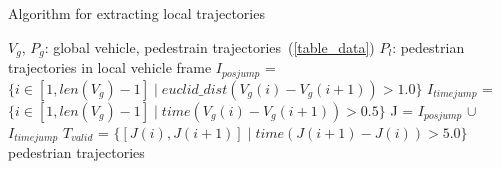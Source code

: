 \begin{algorithm}
	\caption{Algorithm for extracting local trajectories}
	\begin{algorithmic}[1]
		\renewcommand{\algorithmicrequire}{\textbf{Input:}}
		\renewcommand{\algorithmicensure}{\textbf{Output:}}
		\REQUIRE $V_g$, $P_g$: global vehicle, pedestrain trajectories~(\cref{table_data})
		\ENSURE  $P_l$: pedestrian trajectories in local vehicle frame
			\STATE $I_{pos jump}$ = $\{i \in [1,len(V_g)-1] \mid euclid\_dist(V_g(i)-V_g(i+1))>1.0\}$
			\STATE $I_{time jump}$ = $\{i \in [1,len(V_g)-1] \mid time(V_g(i)-V_g(i+1))>0.5\}$
			\STATE J = $I_{pos jump}$ $\cup$ $I_{time jump}$
			\STATE $T_{valid}$ = $\{[J(i), J(i+1)] \mid time(J(i+1) - J(i)) > 5.0\}$
		\ENDFOR
		\RETURN pedestrian trajectories 
	\end{algorithmic} 
\end{algorithm}



